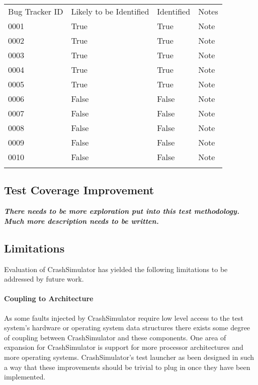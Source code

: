             \begin{table}[H]
                \scriptsize{}
                \begin{tabular}{l  l  l  l}
                    \toprule{}
                        Bug Tracker ID & Likely to be Identified & Identified & Notes \\
                        0001 & True & True & Note \\
                        0002 & True & True & Note \\
                        0003 & True & True & Note \\
                        0004 & True & True & Note \\
                        0005 & True & True & Note \\
                        0006 & False & False & Note \\
                        0007 & False & False & Note \\
                        0008 & False & False & Note \\
                        0009 & False & False & Note \\
                        0010 & False & False & Note \\
                    \bottomrule{}
                \end{tabular}
            \end{table}


    \subsection{Test Coverage Improvement}

        \textbf{\emph{There needs to be more exploration put into this test methodology. Much more description needs to
        be written.}}

    \subsection{Limitations}

        Evaluation of CrashSimulator has yielded the following limitations to be addressed by future work.

        \paragraph{Coupling to Architecture}

            As some faults injected by CrashSimulator require low level access to the test system's hardware or
            operating system data structures there exists some degree of coupling between CrashSimulator and these
            components. One area of expansion for CrashSimulator is support for more processor architectures and more
            operating systems.  CrashSimulator's test launcher as been designed in such a way that these improvements
            should be trivial to plug in once they have been implemented.

